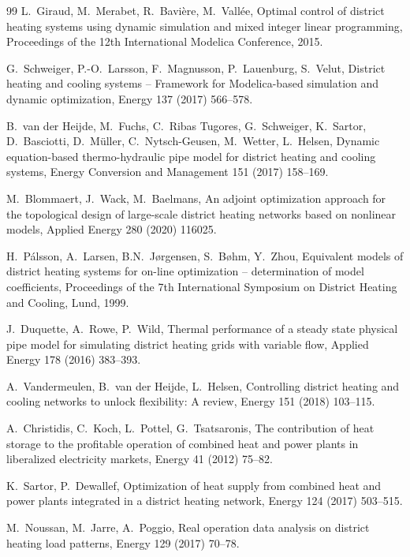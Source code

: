 \documentclass[review,3p]{elsarticle}
\begin{document}
\begin{thebibliography}{99}
L.\ Giraud, M.\ Merabet, R.\ Bavière, M.\ Vallée,
Optimal control of district heating systems using dynamic simulation
and mixed integer linear programming,
Proceedings of the 12th International Modelica Conference, 2015.

G.\ Schweiger, P.-O.\ Larsson, F.\ Magnusson, P.\ Lauenburg,
S.\ Velut,
District heating and cooling systems -- Framework for Modelica-based
simulation and dynamic optimization,
Energy 137 (2017) 566--578.

B.\ van der Heijde, M.\ Fuchs, C.\ Ribas Tugores, G.\ Schweiger,
K.\ Sartor, D.\ Basciotti, D.\ Müller, C.\ Nytsch-Geusen,
M.\ Wetter, L.\ Helsen,
Dynamic equation-based thermo-hydraulic pipe model for district
heating and cooling systems,
Energy Conversion and Management 151 (2017) 158--169.

M.\ Blommaert, J.\ Wack, M.\ Baelmans,
An adjoint optimization approach for the topological design of
large-scale district heating networks based on nonlinear models,
Applied Energy 280 (2020) 116025.

H.\ Pálsson, A.\ Larsen, B.N.\ Jørgensen, S.\ Bøhm, Y.\ Zhou,
Equivalent models of district heating systems for on-line
optimization -- determination of model coefficients,
Proceedings of the 7th International Symposium on District Heating
and Cooling, Lund, 1999.

J.\ Duquette, A.\ Rowe, P.\ Wild,
Thermal performance of a steady state physical pipe model for
simulating district heating grids with variable flow,
Applied Energy 178 (2016) 383--393.

A.\ Vandermeulen, B.\ van der Heijde, L.\ Helsen,
Controlling district heating and cooling networks to unlock
flexibility: A review,
Energy 151 (2018) 103--115.

A.\ Christidis, C.\ Koch, L.\ Pottel, G.\ Tsatsaronis,
The contribution of heat storage to the profitable operation of
combined heat and power plants in liberalized electricity markets,
Energy 41 (2012) 75--82.

K.\ Sartor, P.\ Dewallef,
Optimization of heat supply from combined heat and power plants
integrated in a district heating network,
Energy 124 (2017) 503--515.

M.\ Noussan, M.\ Jarre, A.\ Poggio,
Real operation data analysis on district heating load patterns,
Energy 129 (2017) 70--78.


\end{thebibliography}
\end{document}
